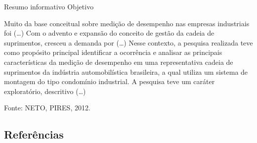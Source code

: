 \documentclass{beamer}
\begin{document}
\begin{frame}{Resumo informativo}
  Objetivo
  \begin{example}
    Muito da base conceitual sobre medição de desempenho nas empresas
    industriais foi (\ldots)%
    Com o advento e expansão do
    conceito de gestão da cadeia de suprimentos, cresceu a demanda por (\ldots)
    \alert{Nesse
    contexto, a pesquisa realizada teve como propósito principal
    identificar a ocorrência e analisar as principais características
    da medição de desempenho em uma representativa cadeia de
    suprimentos da indústria automobilística brasileira, a qual
    utiliza um sistema de montagem do tipo condomínio industrial.} A
    pesquisa teve um caráter exploratório, descritivo (\ldots)%
  \end{example}
  Fonte: NETO, PIRES, 2012.
\end{frame}

\subsection{Referências}
\end{document}
